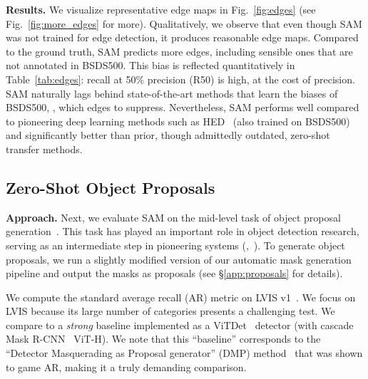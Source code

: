\documentclass[10pt,twocolumn,letterpaper]{article}
\renewcommand{\paragraph}[1]{\vspace{1.25mm}\noindent\textbf{#1}}
\newcommand{\sam}{SAM\xspace}
\newcommand{\fig}[1]{Fig.~\ref{#1}}
\begin{document}
\paragraph{Results.} We visualize representative edge maps in \fig{fig:edges} (see \fig{fig:more_edges} for more). Qualitatively, we observe that even though \sam was not trained for edge detection, it produces reasonable edge maps. Compared to the ground truth, \sam predicts more edges, including sensible ones that are not annotated in BSDS500. This bias is reflected quantitatively in Table~\ref{tab:edges}: recall at 50\% precision (R50) is high, at the cost of precision. \sam naturally lags behind state-of-the-art methods that learn the biases of BSDS500, \ie, which edges to suppress. Nevertheless, \sam performs well compared to pioneering deep learning methods such as HED~\cite{xie2015holistically} (also trained on BSDS500) and significantly better than prior, though admittedly outdated, zero-shot transfer methods.

\subsection{Zero-Shot Object Proposals}\label{subsec:proposals}

\paragraph{Approach.} Next, we evaluate \sam on the mid-level task of object proposal generation~\cite{alexe2010object,Sande2011}. This task has played an important role in object detection research, serving as an intermediate step in pioneering systems (\eg,~\cite{Sande2011,Girshick2014,Ren2015}). To generate object proposals, we run a slightly modified version of our automatic mask generation pipeline and output the masks as proposals (see \S\ref{app:proposals} for details).

We compute the standard average recall (AR) metric on LVIS v1~\cite{Gupta2019}. We focus on LVIS because its large number of categories presents a challenging test. We compare to a \emph{strong} baseline implemented as a ViTDet~\cite{li2022exploring} detector (with cascade Mask R-CNN~\cite{He2017,Cai2018} ViT-H). We note that this ``baseline'' corresponds to the ``Detector Masquerading as Proposal generator'' (DMP) method~\cite{chavali2016object} that was shown to game AR, making it a truly demanding comparison.
\end{document}
